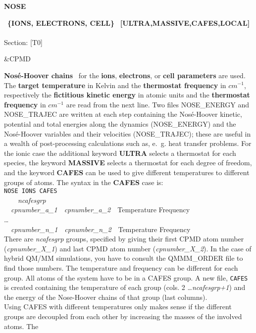 \documentclass[twoside,10pt,titlepage,a4paper]{article}
\newcommand{\reflabel}[1]{\hypertarget{#1}}
\newcommand{\reflabel}[1]{\label{#1}}
\newcommand{\keyword}[5]{%
\vspace{1.0cm}
\begin{minipage}{15cm}
\reflabel{#1}{\textbf{\large #1}}%
\index{#1}%
\ \textbf{#2}%
\ \textbf{#3}%
\ \textit{#4}%
     \hfill\\\smallskip
     {Section: #5}
     \hfill\\\smallskip\vskip 10pt
\end{minipage}
}%
\newcommand{\desc}[1]{%
   \hspace*{\fill} \parbox{130mm}{\sloppy
                          {#1}%
                             }
     \hfill\\\smallskip
   }%
\newcommand{\desc}[1]{#1\vspace{1ex}}
\begin{document}
\keyword{NOSE}{\{IONS, ELECTRONS, CELL\}}{[ULTRA,MASSIVE,CAFES,LOCAL]}{}{[T0]}{\&CPMD}
  \desc{{\bf Nos\'e-Hoover chains}~\cite{Nose84,Hoover85} for the {\bf
      ions}, {\bf electrons}, or {\bf cell parameters} are used.\\
      The {\bf target temperature} in Kelvin and
      the {\bf thermostat frequency}
      in $cm^{-1}$, respectively the {\bf fictitious kinetic
      energy} in atomic units and the {\bf thermostat frequency}
      in $cm^{-1}$ are read from the next line.
      Two files NOSE\_ENERGY and NOSE\_TRAJEC are written at each step containing 
      the Nos\'e-Hoover kinetic, potential and total energies along the dynamics
      (NOSE\_ENERGY) and the Nos\'e-Hoover variables and their velocities (NOSE\_TRAJEC); 
      these are useful in a wealth of post-processing calculations such as, e.~g. 
      heat transfer problems\cite{heat1,heat2}.
      For the ionic case the additional
      keyword {\bf ULTRA} selects a thermostat for each species,
      the keyword {\bf MASSIVE} selects a thermostat for each degree of
      freedom, and the keyword {\bf CAFES} can be used to give different
      temperatures to different groups of atoms\cite{cafes02}.
      The syntax in the {\bf CAFES} case is:\\[2ex]
      \texttt{NOSE IONS CAFES}\\
      ~~~~\textsl{ncafesgrp}\\
      ~~\textsl{cpnumber\_a\_1}~~\textsl{cpnumber\_a\_2}~~Temperature Frequency\\
      \dots\\
      ~~\textsl{cpnumber\_n\_1}~~\textsl{cpnumber\_n\_2}~~Temperature Frequency\\[2ex]
      There are \textsl{ncafesgrp} groups, specified by giving their
      first CPMD atom number (\textsl{cpnumber\_X\_1}) and last CPMD atom
      number (\textsl{cpnumber\_X\_2}). In the case of hybrid QM/MM
      simulations, you have to consult the QMMM\_ORDER file to find those
      numbers. The temperature and frequency can be different for each
      group. All atoms of the system have to be in a CAFES group.
      A new file, \texttt{CAFES} is created containing the temperature
      of each group (cols. 2 \dots \textsl{ncafesgrp+1}) and the energy
      of the Nose-Hoover chains of that group (last columns).\\
      Using CAFES with different temperatures only makes sense if the
      different groups are decoupled from each other by increasing the
      masses of the involved atoms. The
}
\end{document}
